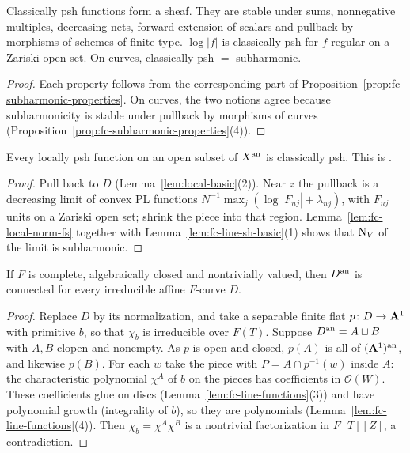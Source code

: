 \begin{proposition}\label{prop:fc-cpsh-properties}
\notready
{}
Classically psh functions form a sheaf. They are stable under sums, nonnegative multiples, decreasing nets, forward
extension of scalars and pullback by morphisms of schemes of finite type. $\log|f|$ is classically psh for $f$ regular
on a Zariski open set. On curves, classically psh $=$ subharmonic.
\end{proposition}

\begin{proof}
Each property follows from the corresponding part of Proposition~\ref{prop:fc-subharmonic-properties}. On curves, the
two notions agree because subharmonicity is stable under pullback by morphisms of curves
(Proposition~\ref{prop:fc-subharmonic-properties}(4)).
\end{proof}

\begin{lemma}\label{lem:fc-locally-psh-cpsh}
\notready
{}
Every locally psh function on an open subset of $X^{\mathrm{an}}$ is classically psh. This is \cite[Lemma~5.2(4)]{FHX}.
\end{lemma}

\begin{proof}
Pull back to $D$ (Lemma~\ref{lem:local-basic}(2)). Near $z$ the pullback is a decreasing limit of convex PL functions
$N^{-1}\max_j(\log|F_{nj}|+\lambda_{nj})$, with $F_{nj}$ units on a Zariski open set; shrink the piece into that region.
Lemma~\ref{lem:fc-local-norm-fs} together with Lemma~\ref{lem:fc-line-sh-basic}(1) shows that $\operatorname{N}_V$ of the limit is
subharmonic.
\end{proof}

\begin{lemma}\label{lem:fc-curve-connected}
\notready
{}
If $F$ is complete, algebraically closed and nontrivially valued, then $D^{\mathrm{an}}$ is connected for every irreducible affine
$F$-curve $D$.
\end{lemma}

\begin{proof}
Replace $D$ by its normalization, and take a separable finite flat $p\colon D\to\mathbf{A}^1$ with primitive $b$, so that $\chi_b$ is
irreducible over $F(T)$. Suppose $D^{\mathrm{an}}=A\sqcup B$ with $A,B$ clopen and nonempty. As $p$ is open and closed, $p(A)$ is all
of $(\mathbf{A}^1)^{\mathrm{an}}$, and likewise $p(B)$. For each $w$ take the piece with $P=A\cap p^{-1}(w)$ inside $A$: the characteristic
polynomial $\chi^A$ of $b$ on the pieces has coefficients in $\mathcal O(W)$. These coefficients glue on discs
(Lemma~\ref{lem:fc-line-functions}(3)) and have polynomial growth (integrality of $b$), so they are polynomials
(Lemma~\ref{lem:fc-line-functions}(4)). Then $\chi_b=\chi^A\chi^B$ is a nontrivial factorization in $F[T][Z]$, a
contradiction.
\end{proof}

